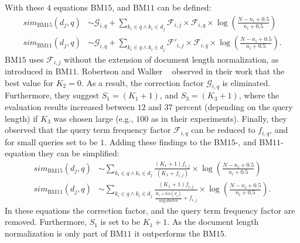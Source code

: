 With these $4$ equations BM$15$, and BM$11$ can be defined:
\begin{align}
  sim_{\text{BM$15$}}(d_j, q) & \sim \mathcal{G}_{i, q} + \sum_{k_i \in q \wedge k_i \in d_j} \mathcal{F}_{i, j}  \times \mathcal{F}_{i, q} \times \log \left(\frac{N - n_i + 0.5}{n_i + 0.5}\right) \\
  sim_{\text{BM$11$}}(d_j, q) & \sim \mathcal{G}_{i, q} + \sum_{k_i \in q \wedge k_i \in d_j} \mathcal{F}'_{i, j} \times \mathcal{F}_{i, q} \times \log \left(\frac{N - n_i + 0.5}{n_i + 0.5}\right).
\end{align}
BM$15$ uses $\mathcal{F}_{i, j}$ without the extension of document length normalization, as introduced in BM$11$. Robertson and Walker ~\cite{RobertsonW94} observed in their work that the best value for $K_2 = 0$. As a result, the correction factor $\mathcal{G}_{i, q}$ is eliminated. Furthermore, they suggest $S_1 = (K_1 + 1)$, and $S_3 = (K_3 + 1)$, where  the evaluation results increased between $12$ and $37$ percent (depending on the query length) if $K_3$ was chosen large (e.g., $100$ as in their experiments). Finally, they observed that the query term frequency factor $\mathcal{F}_{i, q}$ can be reduced to $f_{i, q}$, and for small queries set to be $1$. Adding these findings to the BM$15$-, and BM$11$-equation they can be simplified:
\begin{align}
  sim_{\text{BM$15$}}(d_j, q) & \sim \sum_{k_i \in q \wedge k_i \in d_j} \frac{(K_1 + 1) f_{i, j}}{(K_1 + f_{i, j})} \times \log \left(\frac{N - n_i + 0.5}{n_i + 0.5}\right) \\
  sim_{\text{BM$11$}}(d_j, q) & \sim \sum_{k_i \in q \wedge k_i \in d_j} \frac{(K_1 + 1) f_{i, j}}{\frac{K_1 \times len(d_j)}{avg\_doclen} + f_{i, j}} \times \log \left(\frac{N - n_i + 0.5}{n_i + 0.5}\right).
\end{align}
In these equations the correction factor, and the query term frequency factor are removed. Furthermore, $S_1$ is set to be $K_1 + 1$. As the document length normalization is only part of BM$11$ it outperforms the BM$15$.

